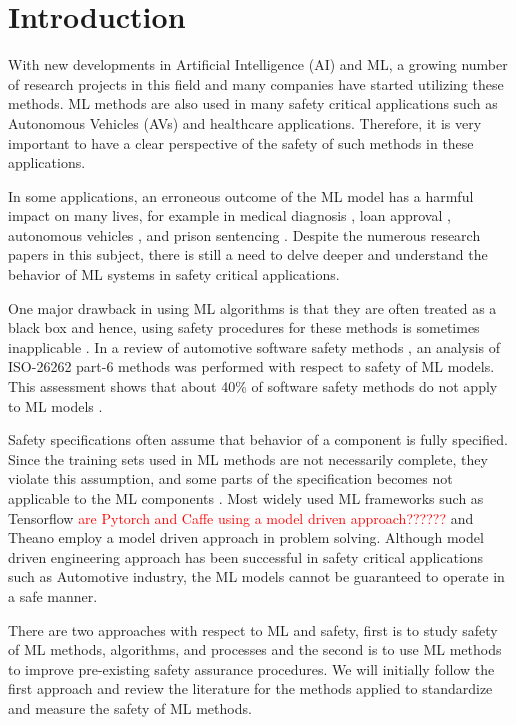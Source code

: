 \chapter{Introduction}

With new developments in Artificial Intelligence (AI) and ML, a growing number of research projects in this field and many companies have started utilizing these methods.
ML methods are also used in many safety critical applications such as Autonomous Vehicles (AVs) and healthcare applications. Therefore, it is very important to have a clear perspective of the safety of such methods in these applications.

In some applications, an erroneous outcome of the ML model has a harmful impact on many lives, for example in medical diagnosis \cite{Foster2014}, loan approval \cite{Lessmann2015}, autonomous vehicles \cite{koopman2016challenges}, and prison sentencing \cite{Berk2015}.
Despite the numerous research papers in this subject, there is still a need to delve deeper and understand the behavior of ML systems in safety critical applications.

One major drawback in using ML algorithms is that they are often treated as a black box and hence, using safety procedures for these methods is sometimes inapplicable \cite{Schwalbe2020}. In a review of automotive software safety methods \cite{Salay2017}, an analysis of ISO-26262 part-6 methods was performed with respect to safety of ML models. This assessment shows that about 40\% of software safety methods do not apply to ML models \cite{Salay2017}.


Safety specifications often assume that behavior of a component is fully specified. Since the training sets used in ML methods are not necessarily complete, they violate this assumption, and some parts of the specification becomes not applicable to the ML components \cite{Salay2017}. 
Most widely used ML frameworks such as Tensorflow \cite{Abadi2016Tensor} \textcolor{red}{are Pytorch and Caffe using a model driven approach??????} and Theano \cite{Al-Rfou} employ a model driven approach in problem solving. Although model driven engineering approach has been successful in safety critical applications such as Automotive industry, the ML models cannot be guaranteed to operate in a safe manner. 

There are two approaches with respect to ML and safety, first is to study safety of ML methods, algorithms, and processes and the second is to use ML methods to improve pre-existing safety assurance procedures.
We will initially follow the first approach and review the literature for the methods applied to standardize and measure the safety of ML methods.

